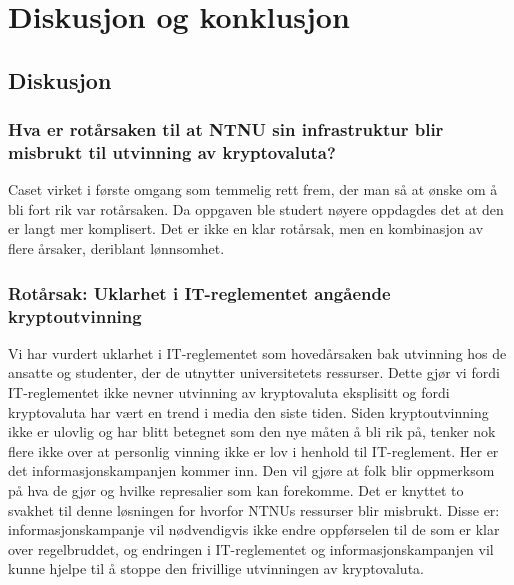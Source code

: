 \chapter{Diskusjon og konklusjon}
\section{Diskusjon}


\subsection{Hva er rotårsaken til at NTNU sin infrastruktur blir misbrukt til utvinning av kryptovaluta?}
Caset virket i første omgang som temmelig rett frem, der man så at ønske om å bli fort rik var rotårsaken. Da oppgaven ble studert nøyere oppdagdes det at den er langt mer komplisert. Det er ikke en klar rotårsak, men en kombinasjon av flere årsaker, deriblant lønnsomhet.

\subsection*{Rotårsak: Uklarhet i IT-reglementet angående kryptoutvinning}
Vi har vurdert uklarhet i IT-reglementet som hovedårsaken bak utvinning hos de ansatte og studenter, der de utnytter universitetets ressurser. Dette gjør vi fordi IT-reglementet ikke nevner utvinning av kryptovaluta eksplisitt og fordi kryptovaluta har vært en trend i media den siste tiden. Siden kryptoutvinning ikke er ulovlig og har blitt betegnet som den nye måten å bli rik på, tenker nok flere ikke over at personlig vinning ikke er lov i henhold til IT-reglement. Her er det informasjonskampanjen kommer inn. Den vil gjøre at folk blir oppmerksom på hva de gjør og hvilke represalier som kan forekomme. Det er knyttet to svakhet til denne løsningen for hvorfor NTNUs ressurser blir misbrukt. Disse er: informasjonskampanje vil nødvendigvis ikke endre oppførselen til de som er klar over regelbruddet, og endringen i IT-reglementet og informasjonskampanjen vil kunne hjelpe til å stoppe den frivillige utvinningen av kryptovaluta.


